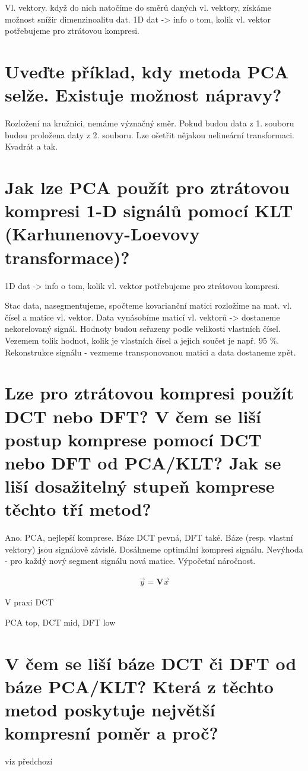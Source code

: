\documentclass[a4paper,12pt]{article}   %
\begin{document}
Vl. vektory. když do nich natočíme do směrů daných vl. vektory, získáme možnost snížir dimenzinoalitu dat. 1D dat -> info o tom, kolik vl. vektor potřebujeme pro ztrátovou kompresi. 



\section{Uveďte příklad, kdy metoda PCA selže. Existuje možnost nápravy?}

Rozložení na kružnici, nemáme význačný směr. Pokud budou data z 1. souboru budou proložena daty z 2. souboru. Lze ošetřit nějakou nelineární transformaci. Kvadrát a tak.

\section{Jak lze PCA použít pro ztrátovou kompresi 1-D signálů pomocí KLT (Karhunenovy-Loevovy transformace)?}

1D dat -> info o tom, kolik vl. vektor potřebujeme pro ztrátovou kompresi. 

Stac data, nasegmentujeme, spočteme kovarianční matici  rozložíme na mat. vl. čísel a matice vl. vektor. Data vynásobíme maticí vl. vektorů -> dostaneme nekorelovaný signál. Hodnoty budou seřazeny podle velikosti vlastních čísel. Vezemem tolik hodnot, kolik je vlastních čísel a jejich součet je např. 95 \%. Rekonstrukce signálu - vezmeme transponovanou matici a data dostaneme zpět.


\section{Lze pro ztrátovou kompresi použít DCT nebo DFT? V čem se liší postup komprese pomocí DCT nebo DFT od PCA/KLT? Jak se liší dosažitelný stupeň komprese těchto tří metod?}
Ano. PCA, nejlepší komprese. Báze DCT pevná, DFT také. Báze (resp. vlastní vektory) jsou signálově závislé. Dosáhneme optimální kompresi signálu. Nevýhoda - pro každý nový segment signálu nová matice. Výpočetní náročnost. 

\begin{align*}
        \vec{y} = \pmb V \vec{x}
\end{align*}

V praxi DCT

PCA top, DCT mid, DFT low

\section{V čem se liší báze DCT či DFT od báze PCA/KLT? Která z těchto metod poskytuje největší kompresní poměr a proč?}
viz předchozí
\end{document}
